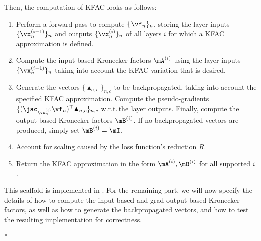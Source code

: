 Then, the computation of KFAC looks as follows:
\begin{enumerate}
\item Perform a forward pass to compute $\{\vf_n\}_n $, storing the layer inputs $\{\vx_n^{(i-1)} \}_n$ and outputs $\{\vx_n^{(i)}\}_n$ of all layers $i$ for which a KFAC approximation is defined.

\item Compute the input-based Kronecker factors $\mA^{(i)}$ using the layer inputs $\{\vx_n^{(i-1)}\}_n$ taking into account the KFAC variation that is desired.

\item Generate the vectors $\{\blacktriangle_{n,c}\}_{n,c}$ to be backpropagated, taking into account the specified KFAC approximation.
  Compute the pseudo-gradients $\{(\jac_{\vx_n^{(i)}} \vf_n)^{\top} \blacktriangle_{n,c} \}_{n,c}$ w.r.t.\,the layer outputs.
  Finally, compute the output-based Kronecker factors $\mB^{(i)}$.
  If no backpropagated vectors are produced, simply set $\mB^{(i)} = \mI$.

\item Account for scaling caused by the loss function's reduction $R$.

\item Return the KFAC approximation in the form $\mA^{(i)}, \mB^{(i)}$ for all supported $i$.
\end{enumerate}
This scaffold is implemented in .
For the remaining part, we will now specify the details of how to compute the input-based and grad-output based Kronecker factors, as well as how to generate the backpropagated vectors, and how to test the resulting implementation for correctness.

\switchcolumn[1]*
\switchcolumn[0]

